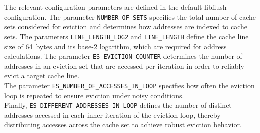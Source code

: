         The relevant configuration parameters are defined in the default libflush~\cite{toolArmageddon} configuration. The parameter 
        \texttt{NUMBER\_OF\_SETS} specifies the total number of cache sets considered for eviction and determines 
        how addresses are indexed to cache sets. The parameters \texttt{LINE\_LENGTH\_LOG2} and \texttt{LINE\_LENGTH} 
        define the cache line size of 64~bytes and its base-2 logarithm, which are required for address calculations. 
        The parameter \texttt{ES\_EVICTION\_COUNTER} determines the number of addresses in an eviction set that are 
        accessed per iteration in order to reliably evict a target cache line. \\
        The parameter 
        \texttt{ES\_NUMBER\_OF\_ACCESSES\_IN\_LOOP} specifies how often the eviction loop is repeated to ensure eviction 
        under noisy conditions. \\
        Finally, \texttt{ES\_DIFFERENT\_ADDRESSES\_IN\_LOOP} defines the number of distinct 
        addresses accessed in each inner iteration of the eviction loop, thereby distributing accesses across the 
        cache set to achieve robust eviction behavior.
